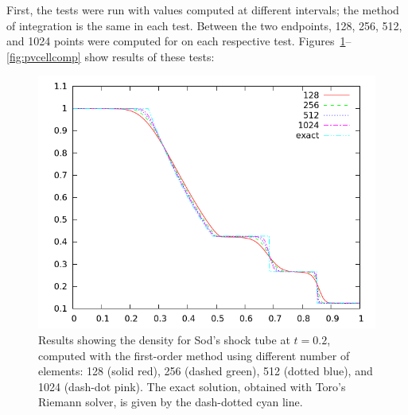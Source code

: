 \documentclass[10pt,preprint]{aastex}
\begin{document}
First, the tests were run with values computed at different intervals; the method of integration is the same in each test. Between the two endpoints, 128, 256, 512, and 1024 points were computed for on each respective test. Figures~\ref{fig:dencellcomp_20}--\ref{fig:pvcellcomp} show results of these tests:
\begin{figure}[h!]
  \begin{center}
    \includegraphics[width=.95\textwidth]{dencellcomp_20}
  \end{center}
  \caption{Results showing the density for Sod's shock tube at $t=0.2$, computed with the first-order method using different number of elements: 128 (solid red), 256 (dashed green), 512 (dotted blue), and 1024 (dash-dot pink).  The exact solution, obtained with Toro's Riemann solver, is given by the dash-dotted cyan line.}
  \label{fig:dencellcomp_20}
\end{figure}
\end{document}
